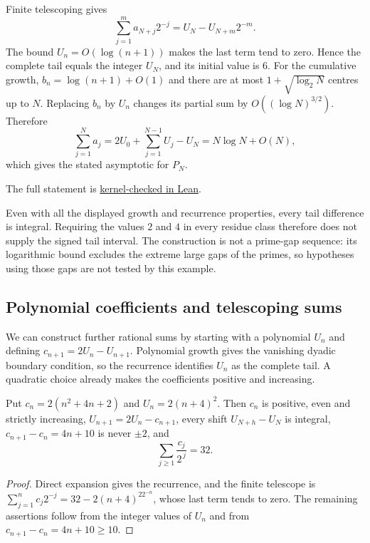 Finite telescoping gives
\[
 \sum_{j=1}^{m}a_{N+j}2^{-j}=U_N-U_{N+m}2^{-m}.
\]
The bound $U_n=O(\log(n+1))$ makes the last term tend to zero.  Hence the
complete tail equals the integer $U_N$, and its initial value is $6$.
For the cumulative growth, $b_n=\log(n+1)+O(1)$ and there are at most
$1+\sqrt{\log_2 N}$ centres up to $N$.  Replacing $b_n$ by $U_n$ changes
its partial sum by $O((\log N)^{3/2})$.  Therefore
\[
 \sum_{j=1}^{N}a_j=2U_0+\sum_{j=1}^{N-1}U_j-U_N
                =N\log N+O(N),
\]
which gives the stated asymptotic for $P_N$.

The full statement is \href{https://github.com/wcook04/plectis-erdos/blob/3d6d938d696fed0fb71dd55115a18a73738ff223/lean/ErdosProblems/Erdos251/AllResidueLogarithmicR9.lean\#L503}{kernel-checked in Lean}.


Even with all the displayed growth and recurrence properties, every
tail difference is integral.  Requiring the values $2$ and $4$ in every
residue class therefore does not supply the signed tail interval.
The construction is not a prime-gap sequence: its logarithmic bound
excludes the extreme large gaps of the primes, so hypotheses using
those gaps are not tested by this example.

\subsection{Polynomial coefficients and telescoping sums}

We can construct further rational sums by starting with a polynomial
$U_n$ and defining $c_{n+1}=2U_n-U_{n+1}$.  Polynomial growth gives the
vanishing dyadic boundary condition, so the recurrence identifies $U_n$
as the complete tail.  A quadratic choice already makes the coefficients
positive and increasing.

\begin{proposition}\label{long251:res:polynomialcountermodel}
Put $c_n=2(n^2+4n+2)$ and $U_n=2(n+4)^2$.  Then $c_n$ is positive, even and
strictly increasing, $U_{n+1}=2U_n-c_{n+1}$, every shift $U_{N+h}-U_N$ is
integral, $c_{n+1}-c_n=4n+10$ is never $\pm2$, and
\[
 \sum_{j\ge1}\frac{c_j}{2^{\,j}}=32 .
\]
\end{proposition}

\begin{proof}
Direct expansion gives the recurrence, and the finite telescope is
$\sum_{j=1}^{n}c_j2^{-j}=32-2(n+4)^22^{-n}$, whose last term tends to zero.
The remaining assertions follow from the integer values of $U_n$ and from
$c_{n+1}-c_n=4n+10\ge10$.
\end{proof}


